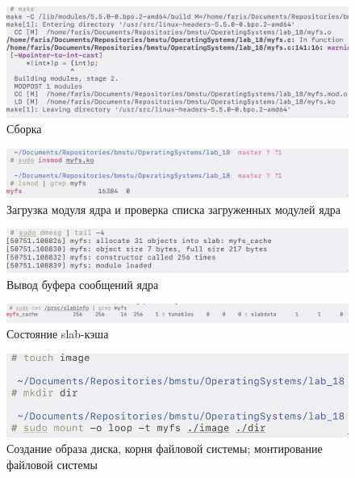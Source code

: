 \begin{figure}[H]
    \centering
    \caption{Сборка}\label{img:scr1}
    \includegraphics[scale=0.3]{images/scr1.png}
\end{figure}

\begin{figure}[H]
    \centering
    \caption{Загрузка модуля ядра и проверка списка загруженных модулей ядра}\label{img:scr2}
    \includegraphics[scale=0.3]{images/scr2.png}
\end{figure}

\begin{figure}[H]
    \centering
    \caption{Вывод буфера сообщений ядра}\label{img:scr3}
    \includegraphics[scale=0.3]{images/scr3.png}
\end{figure}

\begin{figure}[H]
    \centering
    \caption{Состояние slab-кэша}\label{img:scr4}
    \includegraphics[scale=0.3]{images/scr4.png}
\end{figure}

\begin{figure}[H]
    \centering
    \caption{Создание образа диска, корня файловой системы; монтирование файловой системы}\label{img:scr5}
    \includegraphics[scale=0.3]{images/scr5.png}
\end{figure}


